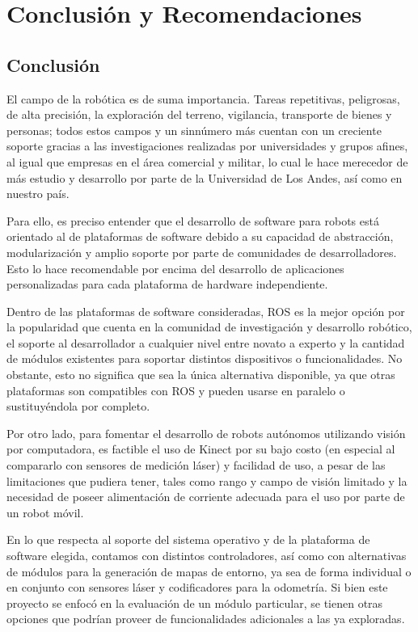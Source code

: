 \chapter{Conclusión y Recomendaciones}

\section{Conclusión}

El campo de la robótica es de suma importancia. Tareas repetitivas, peligrosas, de alta precisión, la exploración del terreno, vigilancia, transporte de bienes y personas; todos estos campos y un sinnúmero más cuentan con un creciente soporte gracias a las investigaciones realizadas por universidades y grupos afines, al igual que empresas en el área comercial y militar, lo cual le hace merecedor de más estudio y desarrollo por parte de la Universidad de Los Andes, así como en nuestro país.

Para ello, es preciso entender que el desarrollo de software para robots está orientado al de plataformas de software debido a su capacidad de abstracción, modularización y amplio soporte por parte de comunidades de desarrolladores. Esto lo hace recomendable por encima del desarrollo de aplicaciones personalizadas para cada plataforma de hardware independiente.

Dentro de las plataformas de software consideradas, ROS es la mejor opción por la popularidad que cuenta en la comunidad de investigación y desarrollo robótico, el soporte al desarrollador a cualquier nivel entre novato a experto y la cantidad de módulos existentes para soportar distintos dispositivos o funcionalidades. No obstante, esto no significa que sea la única alternativa disponible, ya que otras plataformas son compatibles con ROS y pueden usarse en paralelo o sustituyéndola por completo.

Por otro lado, para fomentar el desarrollo de robots autónomos utilizando visión por computadora, es factible el uso de Kinect por su bajo costo (en especial al compararlo con sensores de medición láser) y facilidad de uso, a pesar de las limitaciones que pudiera tener, tales como rango y campo de visión limitado y la necesidad de poseer alimentación de corriente adecuada para el uso por parte de un robot móvil.

En lo que respecta al soporte del sistema operativo y de la plataforma de software elegida, contamos con distintos controladores, así como con alternativas de módulos para la generación de mapas de entorno, ya sea de forma individual o en conjunto con sensores láser y codificadores para la odometría. Si bien este proyecto se enfocó en la evaluación de un módulo particular, se tienen otras opciones que podrían proveer de funcionalidades adicionales a las ya exploradas.

